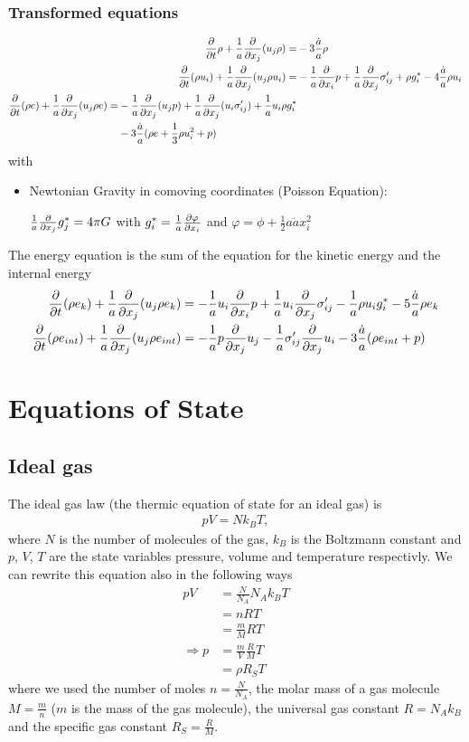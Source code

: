 \subsubsection{Transformed equations}
\begin{align}
\frac{\partial}{\partial t}\rho + \frac{1}{a}\frac{\partial}{\partial x_j}(u_j \rho) =& -3\frac{\dot{a}}{a}\rho  \\
\frac{\partial}{\partial t}(\rho u_i) + \frac{1}{a}\frac{\partial}{\partial x_j}(u_j \rho u_i) =& 
-\frac{1}{a}\frac{\partial}{\partial x_i}p + \frac{1}{a}\frac{\partial}{\partial x_j}\sigma'_{ij} +\rho g^*_i -4\frac{\dot{a}}{a} \rho u_i
\label{eq:commom}
\\
\begin{split}
\frac{\partial}{\partial t}(\rho e) + \frac{1}{a}\frac{\partial}{\partial x_j}(u_j \rho e) =& 
-\frac{1}{a}\frac{\partial}{\partial x_j}(u_j p) + \frac{1}{a}\frac{\partial}{\partial x_j}(u_i \sigma'_{ij}) + \frac{1}{a} u_i \rho g^*_i \\ 
&- 3 \frac{\dot{a}}{a}(\rho e +\frac{1}{3}\rho u^2_i+p)\label{eq:cometot}
\end{split}
\end{align}
with
\begin{itemize}
\item Newtonian Gravity in comoving coordinates (Poisson Equation):
 
$\frac{1}{a}\frac{\partial}{\partial x_j}g^*_j=4\pi G$
with
$g_i^*=\frac{1}{a}\frac{\partial \varphi}{\partial x_i}$ and
$\varphi=\phi+\frac{1}{2}a\ddot{a}x_i^2$
\end{itemize}
The energy equation is the sum of the equation for the kinetic energy and the
internal energy
\begin{align}
\frac{\partial}{\partial t}(\rho e_k)+\frac{1}{a}\frac{\partial}{\partial x_j}(u_j \rho e_k) &= -\frac{1}{a} u_i \frac{\partial}{\partial x_i}p
+\frac{1}{a} u_i \frac{\partial}{\partial x_j}\sigma'_{ij}-\frac{1}{a}\rho u_i g^*_i-5\frac{\dot{a}}{a}\rho e_k\\
\frac{\partial}{\partial t}(\rho e_{int})+\frac{1}{a}\frac{\partial}{\partial x_j}(u_j \rho e_{int})&=
-\frac{1}{a} p \frac{\partial}{\partial x_j}u_j -\frac{1}{a} \sigma'_{ij}\frac{\partial}{\partial x_j}u_i- 3\frac{\dot{a}}{a}(\rho e_{int} +p)
\end{align}

\newpage
\appendix
\section{Equations of State} \label{eos}
\subsection{Ideal gas}
The ideal gas law (the thermic equation of state for an ideal gas)
is
\begin{align}
p V = N k_B T, \label{eq:igl}
\end{align}
where $N$ is the number of molecules of the gas, $k_B$ is the Boltzmann
constant and $p$, $V$, $T$ are the state variables pressure, volume and
temperature respectivly. We can rewrite this equation also in the following 
ways
\begin{align*}
p V &= \frac{N}{N_A} N_A k_B  T \\ 
	 &= n R T \\
    &= \frac{m}{M} R T \\
\Rightarrow p &= \frac{m}{V} \frac{R}{M} T \\
              &= \rho R_S T
\end{align*}
where we used the number of moles $n=\frac{N}{N_A}$, 
the molar mass of a gas molecule $M = \frac{m}{n}$ ($m$ is the
mass of the gas molecule), the universal gas constant $R= N_A k_B$ and the
specific gas constant $R_S=\frac{R}{M}$.

